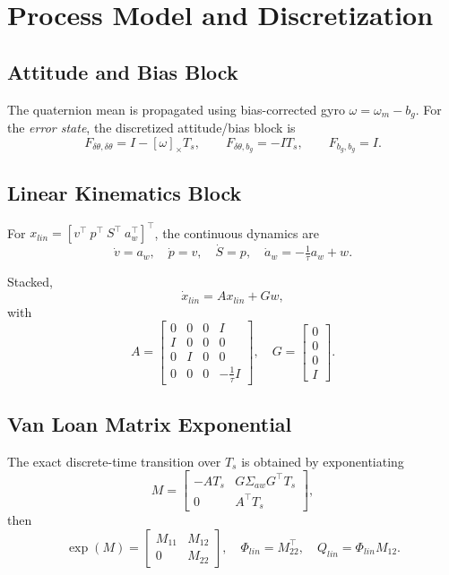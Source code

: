 \documentclass[11pt]{article}
\begin{document}
\section{Process Model and Discretization}

\subsection{Attitude and Bias Block}
The quaternion mean is propagated using bias-corrected gyro $\omega=\omega_m-b_g$.  
For the \emph{error state}, the discretized attitude/bias block is
\[
F_{\delta\theta,\delta\theta} = I - [\omega]_\times T_s,\qquad
F_{\delta\theta,b_g} = -I T_s,\qquad
F_{b_g,b_g}=I.
\]

\subsection{Linear Kinematics Block}
For $x_{lin}=[v^\top\ p^\top\ S^\top\ a_w^\top]^\top$, the continuous dynamics are
\[
\dot v = a_w,\quad \dot p = v,\quad \dot S = p,\quad
\dot a_w = -\tfrac{1}{\tau} a_w + w.
\]

Stacked,
\[
\dot x_{lin} = A x_{lin} + G w,
\]
with
\[
A = \begin{bmatrix}
0 & 0 & 0 & I \\
I & 0 & 0 & 0 \\
0 & I & 0 & 0 \\
0 & 0 & 0 & -\tfrac{1}{\tau} I
\end{bmatrix},\quad
G=\begin{bmatrix}0\\0\\0\\I\end{bmatrix}.
\]

\subsection{Van Loan Matrix Exponential}
The exact discrete-time transition over $T_s$ is obtained by exponentiating
\[
M = \begin{bmatrix}
-AT_s & G\Sigma_{aw}G^\top T_s \\
0 & A^\top T_s
\end{bmatrix},
\]
then
\[
\exp(M) = \begin{bmatrix} M_{11} & M_{12} \\ 0 & M_{22}\end{bmatrix},\quad
\Phi_{lin}=M_{22}^\top,\quad Q_{lin}=\Phi_{lin} M_{12}.
\]
\end{document}
